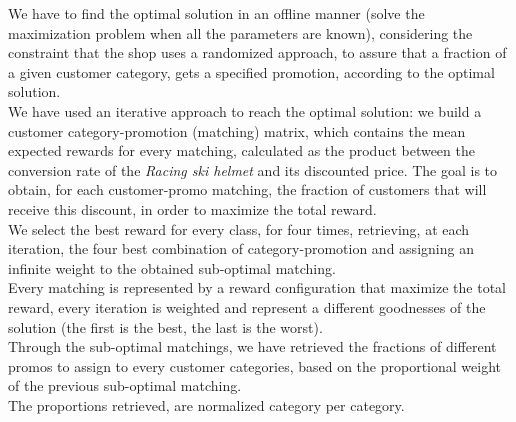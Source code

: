 We have to find the optimal solution in an offline manner (solve the maximization problem when all the parameters are known), considering the constraint that the shop uses a randomized approach, to assure that a fraction of a given customer category, gets a specified promotion, according to the optimal solution.\\ 
We have used an iterative approach to reach the optimal solution: we build a customer category-promotion (matching) matrix, which contains the mean expected rewards for every matching, calculated as the product between the conversion rate of the \textit{Racing ski helmet} and its discounted price.
The goal is to obtain, for each customer-promo matching, the fraction of customers that will receive this discount, in order to maximize the total reward.\\
We select the best reward for every class, for four times, retrieving, at each iteration, the four best combination of category-promotion and assigning an infinite weight to the obtained sub-optimal matching.\\
Every matching is represented by a reward configuration that maximize the total reward, every iteration is weighted and represent a different goodnesses of the solution (the first is the best, the last is the worst).\\
Through the sub-optimal matchings, we have retrieved the fractions of different promos to assign to every customer categories, based on the proportional weight of the previous sub-optimal matching.\\
The proportions retrieved, are normalized category per category.

